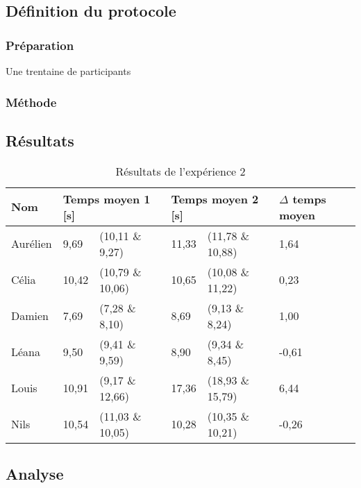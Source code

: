 \documentclass[12pt,fleqn,oneside,openany]{book} %
\begin{document}
\subsection{Définition du protocole} \label{ssec:defProto2.1}

\subsubsection{Préparation} \label{sssec:preparation2.2}
\begin{description}
	\item[Une trentaine de participants]
\end{description}

\subsubsection{Méthode} \label{sssec:methode2.2}

\subsection{Résultats} \label{ssec:resultats2.2}

\begin{table}[h]
	\centering
	\caption{Résultats de l'expérience 2} \label{tbl:exp2.1}
	\begin{tabular}{llllll}
		\toprule
		\textbf{Nom} &  \multicolumn{2}{l}{\textbf{Temps moyen 1 [s]}}  & \multicolumn{2}{l}{\textbf{Temps moyen 2 [s]}} & \textbf{$\Delta$ temps moyen} \\ \midrule
		Aurélien & 9,69 & (10,11 \& 9,27) & 11,33 & (11,78 \& 10,88) & 1,64 \\
		Célia & 10,42 & (10,79 \& 10,06) & 10,65 & (10,08 \& 11,22) & 0,23 \\
		Damien & 7,69 & (7,28 \& 8,10) & 8,69 & (9,13 \& 8,24) & 1,00 \\
		Léana & 9,50 & (9,41 \& 9,59) & 8,90 & (9,34 \& 8,45) & -0,61 \\
		Louis & 10,91 & (9,17 \& 12,66) & 17,36 & (18,93 \& 15,79) & 6,44 \\
		Nils & 10,54 & (11,03 \& 10,05) & 10,28 & (10,35 \& 10,21) & -0,26 \\ \bottomrule
	\end{tabular}
\end{table}

\subsection{Analyse} \label{ssec:analyse2.2}
\end{document}

